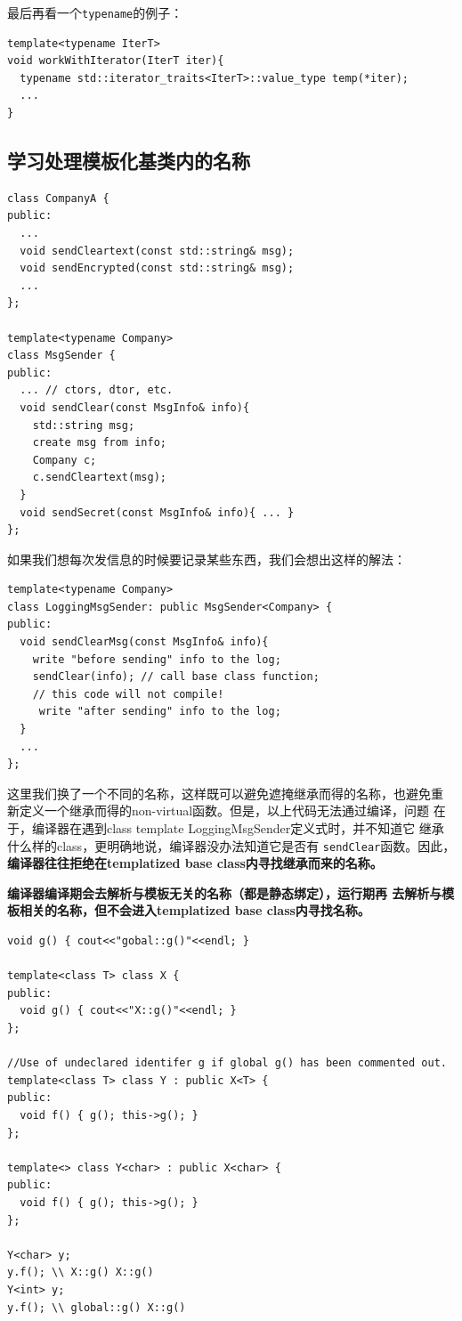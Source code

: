 最后再看一个\texttt{typename}的例子：
\begin{verbatim}
template<typename IterT>
void workWithIterator(IterT iter){
  typename std::iterator_traits<IterT>::value_type temp(*iter);
  ...
}
\end{verbatim}

\subsection{学习处理模板化基类内的名称}
\label{sec:Item-43}

\begin{verbatim}
class CompanyA {
public:
  ...
  void sendCleartext(const std::string& msg);
  void sendEncrypted(const std::string& msg);
  ...
};

template<typename Company>
class MsgSender {
public:
  ... // ctors, dtor, etc.
  void sendClear(const MsgInfo& info){
    std::string msg;
    create msg from info;
    Company c;
    c.sendCleartext(msg);
  }
  void sendSecret(const MsgInfo& info){ ... }
};
\end{verbatim}

如果我们想每次发信息的时候要记录某些东西，我们会想出这样的解法：
\begin{verbatim}
template<typename Company>
class LoggingMsgSender: public MsgSender<Company> {
public:
  void sendClearMsg(const MsgInfo& info){
    write "before sending" info to the log;
    sendClear(info); // call base class function;
    // this code will not compile!
     write "after sending" info to the log;
  }
  ...
};
\end{verbatim}

这里我们换了一个不同的名称，这样既可以避免遮掩继承而得的名称，也避免重
新定义一个继承而得的non-virtual函数。但是，以上代码无法通过编译，问题
在于，编译器在遇到class template LoggingMsgSender定义式时，并不知道它
继承什么样的class，更明确地说，编译器没办法知道它是否有
\texttt{sendClear}函数。因此，\textbf{编译器往往拒绝在templatized base
  class内寻找继承而来的名称。}

\textbf{编译器编译期会去解析与模板无关的名称（都是静态绑定），运行期再
  去解析与模板相关的名称，但不会进入templatized base class内寻找名称。} 

\begin{verbatim}
void g() { cout<<"gobal::g()"<<endl; }

template<class T> class X {
public:
  void g() { cout<<"X::g()"<<endl; }
};

//Use of undeclared identifer g if global g() has been commented out.
template<class T> class Y : public X<T> {
public:
  void f() { g(); this->g(); }
};

template<> class Y<char> : public X<char> {
public:
  void f() { g(); this->g(); }
};

Y<char> y;
y.f(); \\ X::g() X::g()
Y<int> y;
y.f(); \\ global::g() X::g()
\end{verbatim}

